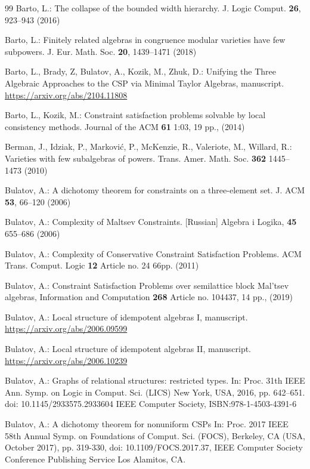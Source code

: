 \documentclass[11pt]{amsart}
\theoremstyle{definition}
\begin{document}
\begin{thebibliography}{99}
	Barto, L.:
	The collapse of the bounded width hierarchy.
	J. Logic Comput.
	{\bf 26},
	923--943
	(2016)

	Barto, L.:
	Finitely related algebras in congruence modular varieties have few subpowers.
	J. Eur. Math. Soc.
	{\bf 20},
	1439--1471
	(2018)
	
	Barto, L., Brady, Z, Bulatov, A., Kozik, M., Zhuk, D.: 
	Unifying the Three Algebraic Approaches to the CSP via Minimal Taylor Algebras, manuscript.
	\url{https://arxiv.org/abs/2104.11808}

	Barto, L., Kozik, M.: 
	Constraint satisfaction problems solvable by local consistency methods.
	Journal of the ACM 
	{\bf 61} 1:03,
	19 pp., 
	(2014)

	Berman, J., Idziak, P., Markovi\'c, P., McKenzie, R., Valeriote, M., Willard, R.:
	Varieties with few subalgebras of powers.
	Trans. Amer. Math. Soc.
	{\bf 362}
	1445--1473
	(2010)

 Bulatov, A.:
	A dichotomy theorem for constraints on a three-element set.
	J. ACM 
	{\bf 53},
	66--120
	(2006)

	Bulatov, A.:
	Complexity of Maltsev Constraints. 
	[Russian]
	Algebra i Logika, 
	{\bf 45}
	655--686
	(2006) 

	Bulatov, A.:
	Complexity of Conservative Constraint Satisfaction Problems.
	ACM Trans. Comput. Logic 
	{\bf 12} 
	Article no. 24
	66pp.
	(2011)

	Bulatov, A.:
	Constraint Satisfaction Problems over semilattice block Mal'tsev algebras,
	Information and Computation {\bf 268}
	Article no. 104437,
	14 pp., 
	(2019)
	
 Bulatov, A.:
	Local structure of idempotent algebras I, manuscript.
	\url{https://arxiv.org/abs/2006.09599}

	Bulatov, A.:
	Local structure of idempotent algebras II, manuscript.
	\url{https://arxiv.org/abs/2006.10239}

	Bulatov, A.:
	Graphs of relational structures: restricted types.
	In: Proc. 31th IEEE Ann. Symp. on Logic in Comput. Sci. (LICS)
	New York, USA, 2016,
	pp. 642--651.
	doi: 10.1145/2933575.2933604
	IEEE Computer Society,
	ISBN:978-1-4503-4391-6

 Bulatov, A.: 
	A dichotomy theorem for nonuniform CSPs
	In: Proc. 2017 IEEE 58th Annual Symp. on Foundations of Comput. Sci. (FOCS),
	Berkeley, CA (USA, October 2017),
	pp. 319-330, doi: 10.1109/FOCS.2017.37,
	IEEE Computer Society Conference Publishing Service
	Los Alamitos, CA.


\end{thebibliography}
\end{document}
